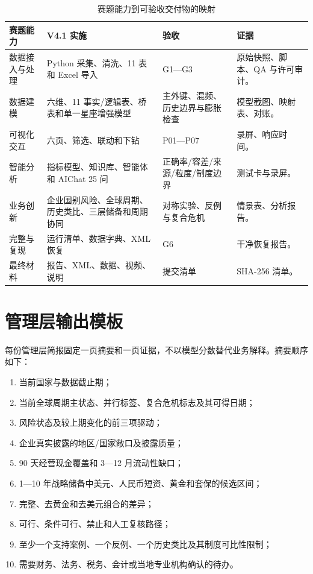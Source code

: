 \documentclass[UTF8,fontset=windows,12pt,openany]{ctexbook}
\begin{document}
\begin{longtable}{p{3.1cm}p{4.1cm}p{3.4cm}p{3.2cm}}
\caption{赛题能力到可验收交付物的映射}\label{tab:competition-map}\\
\toprule
\textbf{赛题能力} & \textbf{V4.1 实施} & \textbf{验收} & \textbf{证据}\\
\midrule
数据接入与处理 & Python 采集、清洗、11 表和 Excel 导入 & G1—G3 & 原始快照、脚本、QA 与许可审计。\\
数据建模 & 六维、11 事实/逻辑表、桥表和单一星座增强模型 & 主外键、混频、历史边界与膨胀检查 & 模型截图、映射表、对账。\\
可视化交互 & 六页、筛选、联动和下钻 & P01—P07 & 录屏、响应时间。\\
智能分析 & 指标模型、知识库、智能体和 AIChat 25 问 & 正确率/容差/来源/粒度/制度边界 & 测试卡与录屏。\\
业务创新 & 企业国别风险、全球周期、历史类比、三层储备和周期协同 & 对称实验、反例与复合危机 & 情景表、分析报告。\\
完整与复现 & 运行清单、数据字典、XML 恢复 & G6 & 干净恢复报告。\\
最终材料 & 报告、XML、数据、视频、说明 & 提交清单 & SHA-256 清单。\\
\bottomrule
\end{longtable}

\chapter{管理层输出模板}

每份管理层简报固定一页摘要和一页证据，不以模型分数替代业务解释。摘要顺序如下：

\begin{enumerate}
  \item 当前国家与数据截止期；
  \item 当前全球周期主状态、并行标签、复合危机标志及其可得日期；
  \item 风险状态及较上期变化的前三项驱动；
  \item 企业真实披露的地区/国家敞口及披露质量；
  \item 90 天经营现金覆盖和 3—12 月流动性缺口；
  \item 1—10 年战略储备中美元、人民币短资、黄金和套保的候选区间；
  \item 完整、去黄金和去美元组合的差异；
  \item 可行、条件可行、禁止和人工复核路径；
  \item 至少一个支持案例、一个反例、一个历史类比及其制度可比性限制；
  \item 需要财务、法务、税务、会计或当地专业机构确认的待办。
\end{enumerate}
\end{document}
